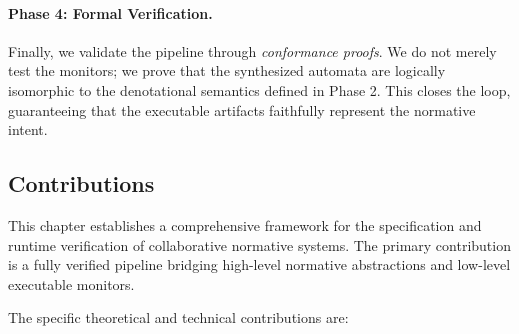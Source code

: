 \documentclass{article}
\begin{document}
\paragraph{Phase 4: Formal Verification.}
Finally, we validate the pipeline through \emph{conformance proofs}.
We do not merely test the monitors; we prove that the synthesized automata are logically isomorphic to the denotational semantics defined in Phase 2.
This closes the loop, guaranteeing that the executable artifacts faithfully represent the normative intent.

\subsection{Contributions}

This chapter establishes a comprehensive framework for the specification and runtime verification of collaborative normative systems.
The primary contribution is a fully verified pipeline bridging high-level normative abstractions and low-level executable monitors.

The specific theoretical and technical contributions are:
\end{document}

